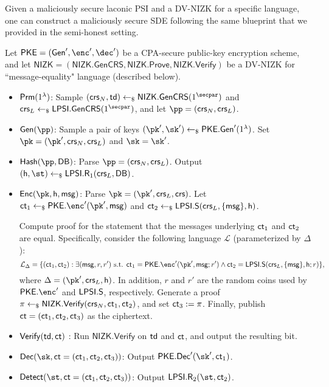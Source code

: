  Given a maliciously secure laconic PSI and a DV-NIZK for a specific language, one can construct a maliciously secure SDE following the same blueprint that we provided in the semi-honest setting.
 \begin{construction}
 
 Let $\mathsf{PKE} = (\Gen', \enc', \dec')$ be a CPA-secure public-key encryption scheme, and let $\mathsf{NIZK}=(\mathsf{NIZK.GenCRS}, \mathsf{NIZK.Prove}, \mathsf{NIZK.Verify})$ be a DV-NIZK for ``message-equality" language (described below). 
 \begin{itemize}
     \item  $\mathsf{Prm}(1^{\lambda})$:  Sample $(\crs_{N}, \td) \pick \mathsf{NIZK.GenCRS}(1^\secpar)$ and $\crs_L \pick \mathsf{LPSI}.\gencrs(1^{\secpar})$, and let $\pp = (\crs_N, \crs_{L})$. 
     \item {$\Gen(\pp)$:}  Sample  a pair of keys $(\pk', \sk') \pick \mathsf{PKE}.\Gen'(1^{\lambda})$. Set $\pk = (\pk', \crs_N, \crs_L)$ and $\sk = \sk'$. 
     \item {$\Hash(\pp, \DB)$:}  Parse $\pp = (\crs_N, \crs_{L})$. Output  $(\hsh, \st) \pick \mathsf{LPSI}.\Rs_1(\crs_L, \DB)$. 
     \item {$\Enc(\pk, \hsh, \msg)$:}  Parse $\pk = (\pk', \crs_L, \crs)$. Let $\ct_1 \pick \mathsf{PKE}.\enc'(\pk', \msg)$ and  $\mathsf{ct}_2 \leftarrow_\$\mathsf{LPSI}. \mathsf{S}(\mathsf{crs}_L,\{\mathsf{msg}\}, {\mathsf{h}})$.
     
 	Compute proof for the statement that the messages underlying $\mathsf{ct}_1$ and $\mathsf{ct}_2$ are equal. Specifically, consider the following language $\mathcal{L}$ (parameterized by $\Delta$):
 	\[\mathcal{L}_{\Delta} = \{(\ct_1, \ct_2): \exists (\msg, r, r') \mbox{ s.t. } \ct_1 = \mathsf{PKE}.\enc'(\pk', \msg; r')  \wedge \ct_2 = \mathsf{LPSI}. \Ss(\crs_L,\{\msg\}, \hsh; r) \},\]
 	where $\Delta = (\pk', \crs_L, \hsh)$. In addition, $r$ and $r'$ are the random coins used by $\mathsf{PKE}.\enc'$ and $\mathsf{LPSI}. \mathsf{S}$, respectively. Generate a proof $\pi \leftarrow_\$ \mathsf{NIZK.Verify}(\mathsf{crs}_N, \mathsf{ct}_1, \mathsf{ct}_2)$, and set $\mathsf{ct}_3 := \pi$. Finally, publish $\mathsf{ct} = (\mathsf{ct}_1, \mathsf{ct}_2, \mathsf{ct}_3)$ as the ciphertext. 

 	\item {$\mathsf{Verify}(\mathsf{td}, \mathsf{ct})$} : Run $\mathsf{NIZK.Verify}$ on $\mathsf{td}$ and $\mathsf{ct}$, and output the resulting bit.
 	\item {$\Dec(\sk, \ct = (\ct_1, \ct_2, \ct_3))$:}  Output $\mathsf{PKE}.\Dec'(\sk', \ct_1)$.
 	\item {$\Det(\st, \ct = (\ct_1, \ct_2, \ct_3))$:}  Output $\mathsf{LPSI}.\Rs_2(\st, \ct_2)$.
	
 \end{itemize}
 \end{construction}

